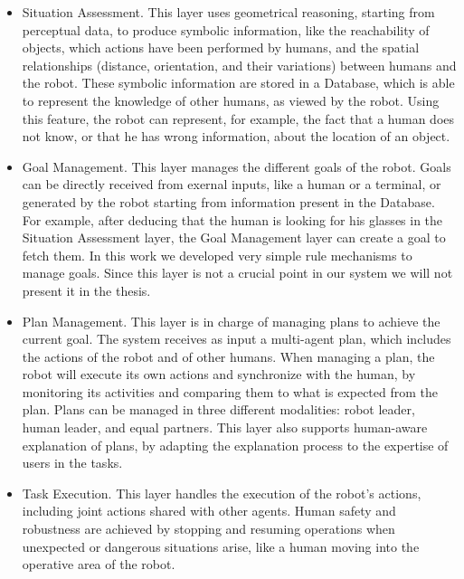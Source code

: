 \begin{itemize}
\item Situation Assessment. This layer uses geometrical reasoning, starting from perceptual data, to produce symbolic information, like the reachability of objects, which actions have been performed by humans, and the spatial relationships (distance, orientation, and their variations) between humans and the robot. These symbolic information are stored in a Database, which is able to represent the knowledge of other humans, as viewed by the robot. Using this feature, the robot can represent, for example, the fact that a human does not know, or that he has wrong information, about the location of an object. 
\item Goal Management. This layer manages the different goals of the robot. Goals can be directly received from exernal inputs, like a human or a terminal, or generated by the robot starting from information present in the Database. For example, after deducing that the human is looking for his glasses in the Situation Assessment layer, the Goal Management layer can create a goal to fetch them. In this work we developed very simple rule mechanisms to manage goals. Since this layer is not a crucial point in our system we will not present it in the thesis.
\item Plan Management. This layer is in charge of managing plans to achieve the current goal. The system receives as input a multi-agent plan, which includes the actions of the robot and of other humans. When managing a plan, the robot will execute its own actions and synchronize with the human, by monitoring its activities and comparing them to what is expected from the plan.
Plans can be managed in three different modalities: robot leader, human leader, and equal partners.  This layer also supports human-aware explanation of plans, by adapting the explanation process to the expertise of users in the tasks. 
\item Task Execution. This layer handles the execution of the robot's actions, including joint actions shared with other agents. Human safety and robustness are achieved by stopping and resuming operations  when unexpected or dangerous situations arise, like a human moving into the operative area of the robot.
\end{itemize}

